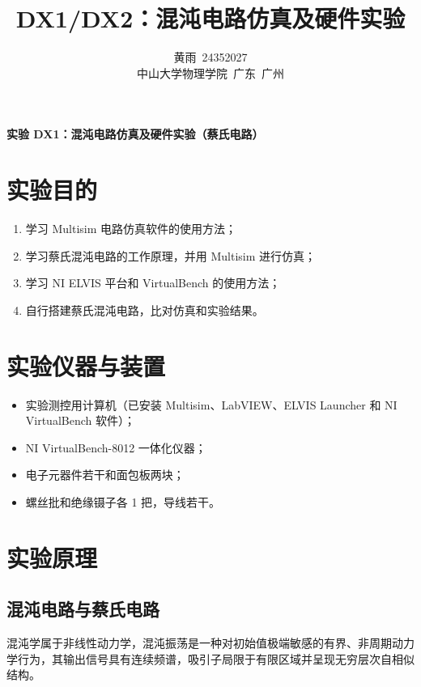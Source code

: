 \documentclass[a4paper,8pt,twocolumn]{article}
\title{
  \textbf{DX1/DX2：混沌电路仿真及硬件实验}
}
\author{
  黄雨~24352027\\
  \small 中山大学物理学院~广东~广州
}
\begin{document}
\maketitle
\newpage

\begin{center}
  {\large\bfseries 实验 DX1：混沌电路仿真及硬件实验（蔡氏电路）}
\end{center}

\section{实验目的}

\begin{enumerate}
  \item 学习 Multisim 电路仿真软件的使用方法；
  \item 学习蔡氏混沌电路的工作原理，并用 Multisim 进行仿真；
  \item 学习 NI ELVIS 平台和 VirtualBench 的使用方法；
  \item 自行搭建蔡氏混沌电路，比对仿真和实验结果。
\end{enumerate}

\section{实验仪器与装置}

\begin{itemize}
  \item 实验测控用计算机（已安装 Multisim、LabVIEW、ELVIS Launcher 和 NI VirtualBench 软件）；
  \item NI VirtualBench-8012 一体化仪器；
  \item 电子元器件若干和面包板两块；
  \item 螺丝批和绝缘镊子各 1 把，导线若干。
\end{itemize}

\section{实验原理}

\subsection{混沌电路与蔡氏电路}

混沌学属于非线性动力学，混沌振荡是一种对初始值极端敏感的有界、非周期动力学行为，其输出信号具有连续频谱，吸引子局限于有限区域并呈现无穷层次自相似结构。
\end{document}
